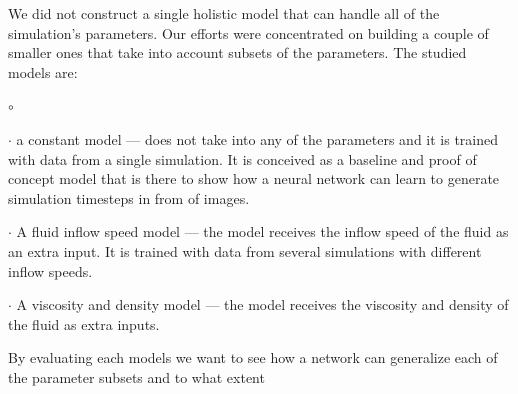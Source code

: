 \documentclass{llncs}
\begin{document}
We did not construct a single holistic model that can handle all of the simulation's parameters. Our efforts were concentrated on building a couple of smaller ones that take into account subsets of the parameters. The studied models are:
\begin{list}{$\circ$}{}
\item[$\cdot$] a constant model --- does not take into any of the parameters and it is trained with data from a single simulation. It is conceived as a baseline and proof of concept model that is there to show how a neural network can learn to generate simulation timesteps in from of images.
\item[$\cdot$] A fluid inflow speed model --- the model receives the inflow speed of the fluid as an extra input. It is trained with data from several simulations with different inflow speeds.
\item[$\cdot$] A viscosity and density model --- the model receives the viscosity and density of the fluid as extra inputs.
\end{list}
By evaluating each models we want to see how a network can generalize each of the parameter subsets and to what extent
\end{document}
